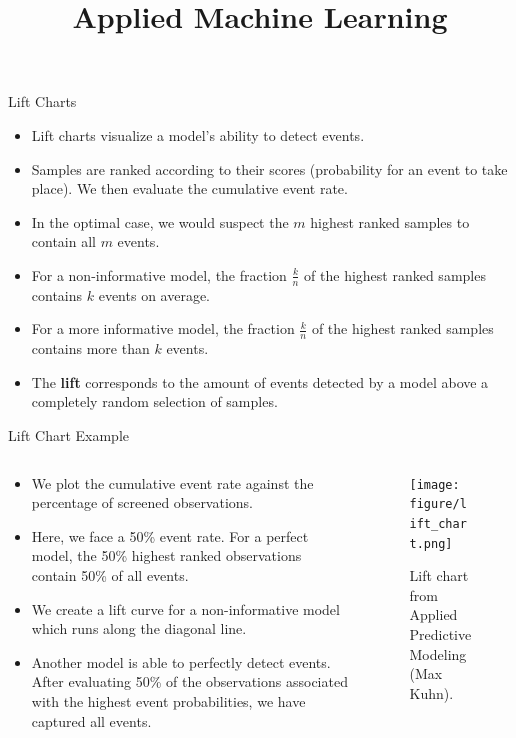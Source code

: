 \documentclass[11pt,compress,t,notes=noshow, aspectratio=169, xcolor=table]{beamer}
\title{Applied Machine Learning}
\date{}
\begin{document}
\begin{frame}{Lift Charts}

\begin{itemize}
\setlength\itemsep{1em}
    \item Lift charts visualize a model's ability to detect events.
    \item Samples are ranked according to their scores (probability for an event to take place). We then evaluate the cumulative event rate.
    \item In the optimal case, we would suspect the $m$ highest ranked samples to contain all $m$ events.
    \item For a non-informative model, the fraction $\frac{k}{n}$ of the highest ranked samples contains $k$ events on average.
    \item For a more informative model, the fraction $\frac{k}{n}$ of the highest ranked samples contains more than $k$ events.
    \item The \textbf{lift} corresponds to the amount of events detected by a model above a completely random selection of samples.
\end{itemize}
\end{frame}



\begin{frame}{Lift Chart Example}
\begin{columns}
\begin{column}{0.5\textwidth}
\begin{itemize}
    \item We plot the cumulative event rate against the percentage of screened observations.
    \item Here, we face a 50\% event rate. For a perfect model, the 50\% highest ranked observations contain 50\% of all events.
    \item We create a lift curve for a non-informative model which runs along the diagonal line.
    \item Another model is able to perfectly detect events. After evaluating 50\% of the observations associated with the highest event probabilities, we have captured all events.
\end{itemize}
\end{column}
\begin{column}{0.5\textwidth}
\begin{figure}
    \centering
    \texttt{[image: figure/lift\_chart.png]}
    \caption{Lift chart from Applied Predictive Modeling (Max Kuhn).}
\end{figure}
\end{column}

\end{columns}

\end{frame}
\end{document}
